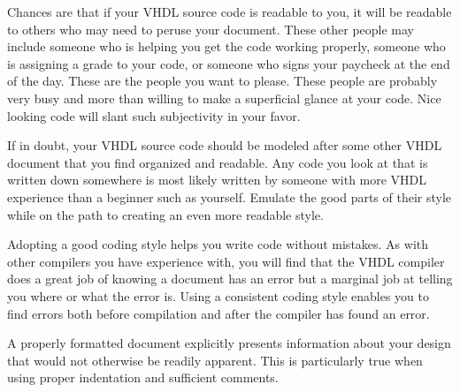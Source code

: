 \begin{my_list}
\item Chances are that if your VHDL source code is readable to you, it will be readable to others who may need to peruse your document. These other people may include someone who is helping you get the code working properly, someone who is assigning a grade to your code, or someone who signs your paycheck at the end of the day. These are the people you want to please. These people are probably very busy and more than willing to make a superficial glance at your code. Nice looking code will slant such subjectivity in your favor.
\item If in doubt, your VHDL source code should be modeled after some other VHDL document that you find organized and readable. Any code you look at that is written down somewhere is most likely written by someone with more VHDL experience than a beginner such as yourself. Emulate the good parts of their style while on the path to creating an even more readable style.
\item Adopting a good coding style helps you write code without mistakes. As with other compilers you have experience with, you will find that the VHDL compiler does a great job of knowing a document has an error but a marginal job at telling you where or what the error is. Using a consistent coding style enables you to find errors both before compilation and after the compiler has found an error.
\item A properly formatted document explicitly presents information about your design that would not otherwise be readily apparent. This is particularly true when using proper indentation and sufficient comments.
\end{my_list}
\null\newpage
\thispagestyle{empty}



